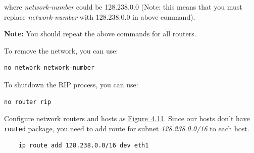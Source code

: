 \documentclass{UTNetLab}
\begin{document}
    where \textit{network-number} could be 128.238.0.0 (Note: this means that you must replace \textit{network-number} with 128.238.0.0 in above command).
    
    \textbf{Note: }You should repeat the above commands for all routers.
    
    To remove the network, you can use:
        
    \begin{lstlisting}[frame=trBL]
    no network network-number
    \end{lstlisting}
    To shutdown the RIP process, you can use:
    
    \begin{lstlisting}[frame=trBL]
    no router rip
    \end{lstlisting}
   

    
    Configure network routers and hosts as \hyperref[fig:4.11]{Figure~4.11}. Since our hosts don’t have \lstinline{routed} package, you need to add route for subnet \textit{128.238.0.0/16} to each host.
    
    \begin{lstlisting}
    ip route add 128.238.0.0/16 dev eth1
    \end{lstlisting}
    
\end{document}
